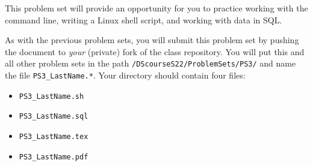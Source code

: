 \documentclass[12pt,english]{exam}
\begin{document}
This problem set will provide an opportunity for you to practice working with the command line, writing a Linux shell script, and working with data in SQL.

As with the previous problem sets, you will submit this problem set by pushing the document to \emph{your} (private) fork of the class repository. You will put this and all other problem sets in the path \texttt{/DScourseS22/ProblemSets/PS3/} and name the file \texttt{PS3\_LastName.*}. Your directory should contain four files:
\begin{itemize}
    \item \texttt{PS3\_LastName.sh}
    \item \texttt{PS3\_LastName.sql}
    \item \texttt{PS3\_LastName.tex}
    \item \texttt{PS3\_LastName.pdf}
\end{itemize}
\end{document}
